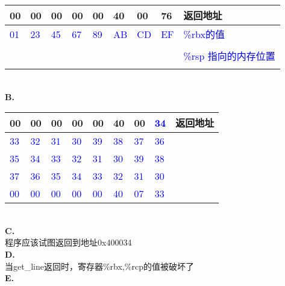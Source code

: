 \documentclass{article}
\newcommand{\blue}[1]{\textcolor{blue}{#1}}
\begin{document}
\begin{CJK}{UTF8}{uyhei}
\renewcommand\arraystretch{1.4}
\begin{table}[htbp]
\centering
\begin{tabular}{|m{2em}<{\centering}m{2em}<{\centering}m{2em}<{\centering}m{2em}<{\centering}m{2em}<{\centering}m{2em}<{\centering}m{2em}<{\centering}m{2em}<{\centering}|m{16em}<{\centering}|}
\hline
00	&	00	&	00	&	00	&	00	&	40	&	00	&	76	&	返回地址	\\
\hline
\blue{01}	&	\blue{23}	&	\blue{45}	&	\blue{ 67 }	&	\blue{ 89 }	&	\blue{ AB }	&	\blue{ CD }	&	\blue{ EF }	&	\blue{\%rbx的值}	\\
\hline
	&		&		&		&		&		&		&		&	\\
\hline
	&		&		&		&		&		&		&		&
	\blue{  \%rsp 指向的内存位置 }	\\
\hline
	&		&		&		&		&		&		&		&	\\
\hline
\end{tabular}
\end{table}	\\[2ex]
\newpage
\noindent\textbf{B.}	\\[-2ex]
\renewcommand\arraystretch{1.4}
\begin{table}[htbp]
\centering
\begin{tabular}{|m{2em}<{\centering}m{2em}<{\centering}m{2em}<{\centering}m{2em}<{\centering}m{2em}<{\centering}m{2em}<{\centering}m{2em}<{\centering}m{2em}<{\centering}|m{16em}<{\centering}|}
\hline
00	&	00	&	00	&	00	&	00	&	40	&	00	&	\blue{34}	&	返回地址	\\
\hline
\blue{33}	&	\blue{32}	&	\blue{31}	&	\blue{30}	&	\blue{39}	&	\blue{38}	&	\blue{37}	&	\blue{36}	&	\\
\hline
\blue{35}	&	\blue{34}	&	\blue{33}	&	\blue{32}	&	\blue{31}	&	\blue{30}	&	\blue{39}	&	\blue{38}	&	\\
\hline
\blue{37}	&	\blue{36}	&	\blue{35}	&	\blue{34}	&	\blue{33}	&	\blue{32}	&	\blue{31}	&	\blue{30}	&	\\
\hline
\blue{00}	&	\blue{ 00 }	&	\blue{ 00 }	&	\blue{ 00 }	&	\blue{ 00 }	&	\blue{40}	&	\blue{07}	&	\blue{33}	&		\\
\hline
\end{tabular}
\end{table}	\\
\textbf{C.}	\\
程序应该试图返回到地址0x400034	\\[2ex]
\textbf{D.}	\\
当get\_line返回时，寄存器\%rbx,\%rcp的值被破坏了	\\[2ex]
\textbf{E.}	\\

\end{CJK}
\end{document}
